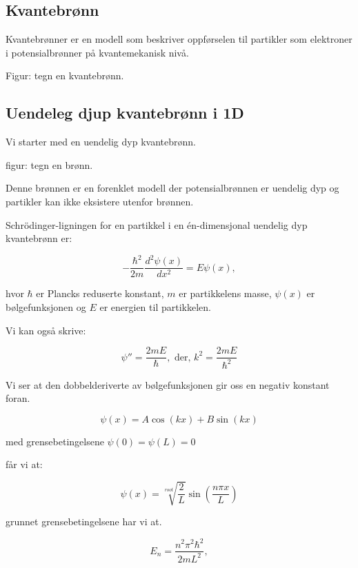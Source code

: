 \homeworkProblem[2]

\subsection*{Kvantebrønn}

Kvantebrønner er en modell som beskriver oppførselen til partikler som elektroner i potensialbrønner på kvantemekanisk nivå.

Figur: tegn en kvantebrønn.

\subsection*{Uendeleg djup kvantebrønn i 1D}
Vi starter med en uendelig dyp kvantebrønn.

figur: tegn en brønn.

Denne brønnen er en forenklet modell der potensialbrønnen er uendelig dyp og partikler kan ikke eksistere utenfor brønnen.

Schrödinger-ligningen for en partikkel i en én-dimensjonal uendelig dyp kvantebrønn er:

\begin{equation*}
-\frac{\hbar^2}{2m}\frac{d^2\psi(x)}{dx^2} = E\psi(x),
\end{equation*}

hvor $\hbar$ er Plancks reduserte konstant, $m$ er partikkelens masse, $\psi(x)$ er bølgefunksjonen og $E$ er energien til partikkelen.

Vi kan også skrive:

\begin{equation*}
    \psi'' = \frac{2mE}{\hbar}, \text{  der, } k^2 = \frac{2mE}{\hbar^2} 
\end{equation*}

Vi ser at den dobbelderiverte av bølgefunksjonen gir oss en negativ konstant foran.

\begin{equation*}
    \psi(x)=A\cos(kx)+B\sin(kx)
\end{equation*}

med grensebetingelsene $\psi(0)=\psi(L)=0$

får vi at:

\begin{equation*}
    \psi(x)=\sqrt[root]{\frac{2}{L}}\sin(\frac{n\pi x}{L})
\end{equation*}


grunnet grensebetingelsene har vi at.

\begin{equation*}
E_n = \frac{n^2\pi^2\hbar^2}{2mL^2},
\end{equation*}

